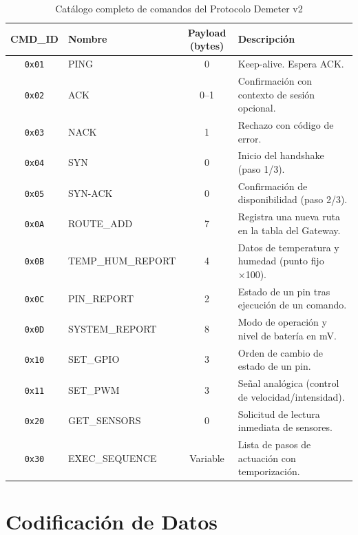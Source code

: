 \begin{table}[H]
    \centering
    \caption{Catálogo completo de comandos del Protocolo Demeter v2}
    \begin{tabular}{clcp{5cm}}
        \toprule
        \textbf{CMD\_ID} & \textbf{Nombre} & \textbf{Payload (bytes)} & \textbf{Descripción} \\
        \midrule
        \texttt{0x01} & PING            & 0  & Keep-alive. Espera ACK. \\
        \texttt{0x02} & ACK             & 0--1 & Confirmación con contexto de sesión opcional. \\
        \texttt{0x03} & NACK            & 1  & Rechazo con código de error. \\
        \texttt{0x04} & SYN             & 0  & Inicio del handshake (paso 1/3). \\
        \texttt{0x05} & SYN-ACK         & 0  & Confirmación de disponibilidad (paso 2/3). \\
        \texttt{0x0A} & ROUTE\_ADD      & 7  & Registra una nueva ruta en la tabla del Gateway. \\
        \texttt{0x0B} & TEMP\_HUM\_REPORT & 4 & Datos de temperatura y humedad (punto fijo ×100). \\
        \texttt{0x0C} & PIN\_REPORT     & 2  & Estado de un pin tras ejecución de un comando. \\
        \texttt{0x0D} & SYSTEM\_REPORT  & 8  & Modo de operación y nivel de batería en mV. \\
        \texttt{0x10} & SET\_GPIO       & 3  & Orden de cambio de estado de un pin. \\
        \texttt{0x11} & SET\_PWM        & 3  & Señal analógica (control de velocidad/intensidad). \\
        \texttt{0x20} & GET\_SENSORS    & 0  & Solicitud de lectura inmediata de sensores. \\
        \texttt{0x30} & EXEC\_SEQUENCE  & Variable & Lista de pasos de actuación con temporización. \\
        \bottomrule
    \end{tabular}
    \label{tab:catalogo_comandos}
\end{table}

\section{Codificación de Datos}

